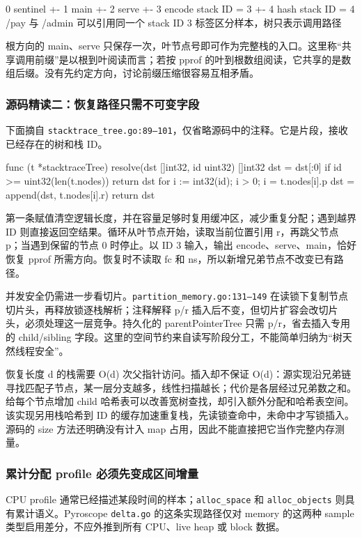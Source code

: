 \documentclass[UTF8,fontset=fandol,openany,11pt]{ctexbook}
\begin{document}
\begin{codeblock}
0 sentinel
+- 1 main
   +- 2 serve
      +- 3 encode    stack ID = 3
      +- 4 hash      stack ID = 4
/pay 与 /admin 可以引用同一个 stack ID 3
标签区分样本，树只表示调用路径
\end{codeblock}

根方向的 main、serve 只保存一次，叶节点号即可作为完整栈的入口。这里称“共享调用前缀”是以根到叶阅读而言；若按 pprof 的叶到根数组阅读，它共享的是数组后缀。没有先约定方向，讨论前缀压缩很容易互相矛盾。\cite{proj-pyro-tree}

\subsubsection{源码精读二：恢复路径只需不可变字段}
下面摘自 \texttt{stacktrace\_\allowbreak{}tree.\allowbreak{}go:\allowbreak{}89–101}，仅省略源码中的注释。它是片段，接收已经存在的树和栈 ID。

\begin{codeblock}
func (t *stacktraceTree) resolve(dst []int32, id uint32) []int32 {
    dst = dst[:0]
    if id >= uint32(len(t.nodes)) {
        return dst
    }
    for i := int32(id); i > 0; i = t.nodes[i].p {
        dst = append(dst, t.nodes[i].r)
    }
    return dst
}
\end{codeblock}

第一条赋值清空逻辑长度，并在容量足够时复用缓冲区，减少重复分配；遇到越界 ID 则直接返回空结果。循环从叶节点开始，读取当前位置引用 r，再跳父节点 p；当遇到保留的节点 0 时停止。以 ID 3 输入，输出 encode、serve、main，恰好恢复 pprof 所需方向。恢复时不读取 fc 和 ns，所以新增兄弟节点不改变已有路径。

并发安全仍需进一步看切片。\texttt{partition\_\allowbreak{}memory.\allowbreak{}go:\allowbreak{}131–149} 在读锁下复制节点切片头，再释放锁逐栈解析；注释解释 p/r 插入后不变，但切片扩容会改切片头，必须处理这一层竞争。持久化的 parentPointerTree 只需 p/r，省去插入专用的 child/sibling 字段。这里的空间节约来自读写阶段分工，不能简单归纳为“树天然线程安全”。

恢复长度 d 的栈需要 O(d) 次父指针访问。插入却不保证 O(d)：源实现沿兄弟链寻找匹配子节点，某一层分支越多，线性扫描越长；代价是各层经过兄弟数之和。给每个节点增加 child 哈希表可以改善宽树查找，却引入额外分配和哈希表空间。该实现另用栈哈希到 ID 的缓存加速重复栈，先读锁查命中，未命中才写锁插入。源码的 size 方法还明确没有计入 map 占用，因此不能直接把它当作完整内存测量。

\subsubsection{累计分配 profile 必须先变成区间增量}
CPU profile 通常已经描述某段时间的样本；\texttt{alloc\_\allowbreak{}space} 和 \texttt{alloc\_\allowbreak{}objects} 则具有累计语义。Pyroscope \texttt{delta.\allowbreak{}go} 的这条实现路径仅对 memory 的这两种 sample 类型启用差分，不应外推到所有 CPU、live heap 或 block 数据。\cite{proj-pyro-delta}
\end{document}
